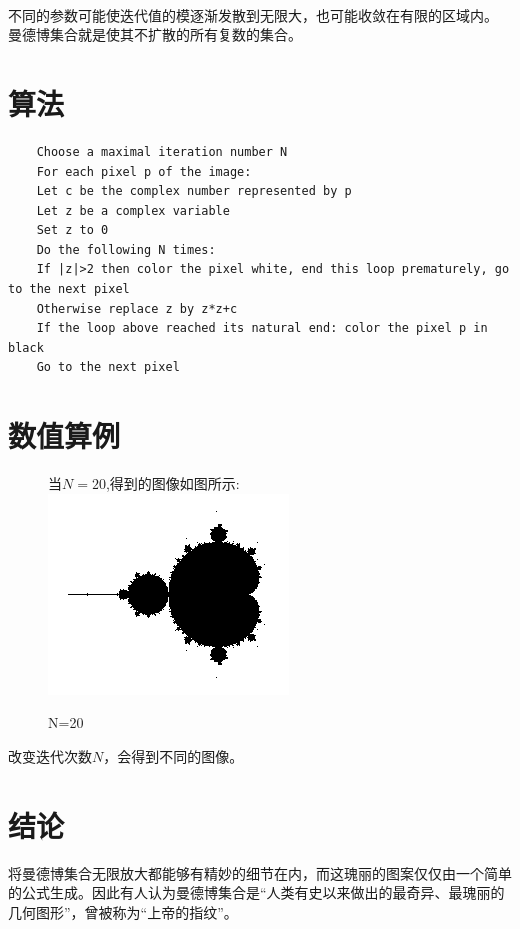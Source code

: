 \documentclass{article}
\begin{document}
   	\paragraph{}
   	不同的参数可能使迭代值的模逐渐发散到无限大，也可能收敛在有限的区域内。
   	曼德博集合就是使其不扩散的所有复数的集合。
   	\section{算法}
   	\begin{verbatim}
   	Choose a maximal iteration number N
   	For each pixel p of the image:
   	Let c be the complex number represented by p
   	Let z be a complex variable
   	Set z to 0
   	Do the following N times:    
   	If |z|>2 then color the pixel white, end this loop prematurely, go to the next pixel
   	Otherwise replace z by z*z+c
   	If the loop above reached its natural end: color the pixel p in black
   	Go to the next pixel
   	\end{verbatim}
   	\section{数值算例}
   	\begin{figure}[ht]
   		当$N=20$,得到的图像如图所示:\\
   		\includegraphics[width=1\linewidth]{images/test.bmp}
   		\caption{N=20}
   	\end{figure}
   	改变迭代次数$N$，会得到不同的图像。
   	\section{结论} 
   	将曼德博集合无限放大都能够有精妙的细节在内，而这瑰丽的图案仅仅由一个简单的公式生成。因此有人认为曼德博集合是“人类有史以来做出的最奇异、最瑰丽的几何图形”，曾被称为“上帝的指纹”。
   	
   	
   	
   	
   	
   
\end{document}

